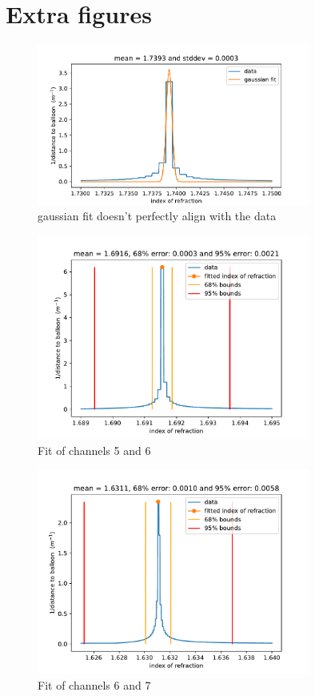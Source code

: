 \documentclass[11pt,a4paper,faculty=we,language=en,doctype=report]{cls/ugent-doc}
\begin{document}
\chapter{Extra figures}
\begin{figure}[h!]
	\centering
	\includegraphics[width=0.8\textwidth]{GaussianFit.pdf}
	\caption{gaussian fit doesn't perfectly align with the data}
	\label{fig:GaussFit}
\end{figure}
\begin{figure}
	\centering
	\includegraphics[width=0.8\textwidth]{Ch5And6Fit.pdf}
	\caption{Fit of channels 5 and 6}
	\label{fig:Ch5And6}
\end{figure}
\begin{figure}
	\centering
	\includegraphics[width=0.8\textwidth]{Ch6And7Fit.pdf}
	\caption{Fit of channels 6 and 7}
	\label{fig:Ch6And7}
\end{figure}
\end{document}
